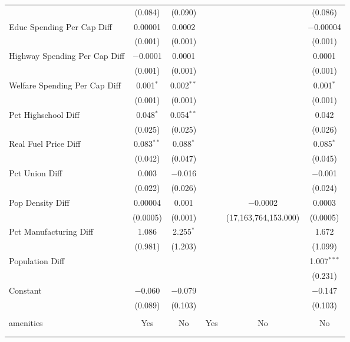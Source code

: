 \begin{table}[!htbp]
\begin{tabular}{@{\extracolsep{5pt}}lccccc}
  & (0.084) & (0.090) &  &  & (0.086) \\ 
  Educ Spending Per Cap Diff & 0.00001 & 0.0002 &  &  & $-$0.00004 \\ 
  & (0.001) & (0.001) &  &  & (0.001) \\ 
  Highway Spending Per Cap Diff & $-$0.0001 & 0.0001 &  &  & 0.0001 \\ 
  & (0.001) & (0.001) &  &  & (0.001) \\ 
  Welfare Spending Per Cap Diff & 0.001$^{*}$ & 0.002$^{**}$ &  &  & 0.001$^{*}$ \\ 
  & (0.001) & (0.001) &  &  & (0.001) \\ 
  Pct Highschool Diff & 0.048$^{*}$ & 0.054$^{**}$ &  &  & 0.042 \\ 
  & (0.025) & (0.025) &  &  & (0.026) \\ 
  Real Fuel Price Diff & 0.083$^{**}$ & 0.088$^{*}$ &  &  & 0.085$^{*}$ \\ 
  & (0.042) & (0.047) &  &  & (0.045) \\ 
  Pct Union Diff & 0.003 & $-$0.016 &  &  & $-$0.001 \\ 
  & (0.022) & (0.026) &  &  & (0.024) \\ 
  Pop Density Diff & 0.00004 & 0.001 &  & $-$0.0002 & 0.0003 \\ 
  & (0.0005) & (0.001) &  & (17,163,764,153.000) & (0.0005) \\ 
  Pct Manufacturing Diff & 1.086 & 2.255$^{*}$ &  &  & 1.672 \\ 
  & (0.981) & (1.203) &  &  & (1.099) \\ 
  Population Diff &  &  &  &  & 1.007$^{***}$ \\ 
  &  &  &  &  & (0.231) \\ 
  Constant & $-$0.060 & $-$0.079 &  &  & $-$0.147 \\ 
  & (0.089) & (0.103) &  &  & (0.103) \\ 
 \hline \\[-1.8ex] 
amenities & Yes & No & Yes & No & No \\ 
\hline \\[-1.8ex] 
\hline 
\hline \\[-1.8ex] 
\end{tabular} 
\end{table} 
